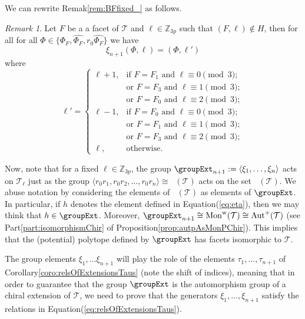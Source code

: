 \documentclass[final]{amsart}
\theoremstyle{plain}
\theoremstyle{definition}
\theoremstyle{remark}
\newtheorem{remark}[thm]{Remark}
\numberwithin{equation}{section}
\renewcommand{\{}{\lbrace}
\renewcommand{\}}{\rbrace}
\renewcommand{\hat}{\widehat}
\newcommand{\bZ}{\mathbb{Z}}
\newcommand{\cT}{\mathcal{T}}
\DeclareMathOperator{\Fw}{\mathcal{F}^{w}}
\DeclareMathOperator{\mon}{Mon}
\DeclareMathOperator{\monp}{\mon^{+}}
\DeclareMathOperator{\monw}{\mon^{w}}
\newcommand{\kng}{{h}}
\newcommand{\te}{\xi}
\begin{document}
We can rewrite Remak\nobreakspace \ref {rem:BFfixed_} as follows.

\begin{remark}\label{rem:BFfixed}
 Let $F$ be a a facet of $\cT$ and $\ell \in \bZ_{3p} $ such that $(F,\ell) \not\in H$, then for all  
 for all $\Phi \in \{\Phi_{F}, \hat{\Phi_F}, r_{0} \hat{\Phi_F}  \}$ we have
 \begin{equation}
  \te_{n+1} (\Phi,\ell) = (\Phi,\ell')
\end{equation}
where 
\[ 
  \ell' =
  \begin{cases}
	  \ell+1, 
            &\text{if } F= F_{1} \text{ and } \ell \equiv 0 \pmod{3};\\ 
            &\text{or } F=F_{3}\text{ and } \ell \equiv 1 \pmod{3}; \\
            &\text{or } F= F_{0} \text{ and } \ell \equiv 2 \pmod{3}; \\
	  \ell-1 , 
            &\text{if } F = F_{0} \text{ and } \ell \equiv 0 \pmod{3};\\ 
            &\text{or } F = F_{1}  \text{ and } \ell \equiv 1 \pmod{3}; \\
            &\text{or } F = F_{3} \text{ and } \ell \equiv 2 \pmod{3}; \\
	  \ell, &\text{otherwise.}
 \end{cases}
\] 
\end{remark}




Now, note that for a fixed $\ell \in \bZ_{3p}$, the group $\groupExt_{n+1} := \langle \te_{1}, \dots, \te_{n} \rangle$ acts on  $\cT_\ell$ just as the group $\langle r_{0}r_{1}, r_{0} r_{2}, \dots, r_{0}r_{n} \rangle \cong \monp(\cT)$ acts on the set $\Fw(\cT)$.
We abuse  notation by considering the elements of $\monw(\cT)$ as elements of $\groupExt$. 
In particular, if $\kng$ denotes the element defined in Equation\nobreakspace \textup {(\ref {eq:eta})}, then we may think that $\kng \in \groupExt$.
Moreover, $\groupExt_{n+1} \cong \monw(\cT) \cong \autp(\cT)$ (see Part\nobreakspace \ref {part:isomorphismChir} of Proposition\nobreakspace \ref {prop:autpAsMonPChir}).
This implies that the (potential) polytope defined by $\groupExt$ has facets isomorphic to $\cT$.

The group elements $\te_{1}, \dots \te_{n+1}$ will play the role of the elements $\tau_{1}, \dots, \tau_{n+1}$ of Corollary\nobreakspace \ref {coro:relsOfExtensionsTaus} (note the shift of indices), meaning that in order to guarantee that the group $\groupExt$ is the automorphism group of a chiral extension of $\cT$, we need to prove that the generators $\te_{1}, \dots, \te_{n+1}$ satisfy the relations in Equation\nobreakspace \textup {(\ref {eq:relsOfExtensionsTaus})}. 
\end{document}
